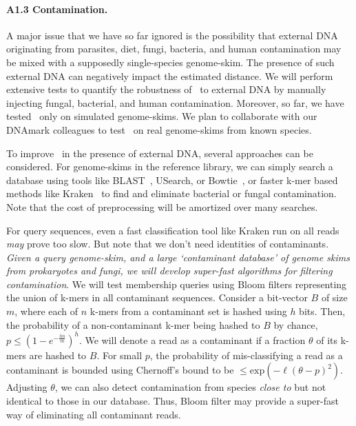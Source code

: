 \paragraph{A1.3 Contamination.}
A major issue that we have so far ignored is 
the possibility that external DNA originating from parasites, diet, fungi, bacteria, and human contamination may be mixed 
with a supposedly single-species genome-skim.
The presence of such external DNA can negatively impact the estimated distance. 
We will perform extensive tests
to quantify the robustness of \skmer\ to 
external DNA by manually injecting
fungal, bacterial, and human contamination.
Moreover, so far, we have tested \skmer\  only on simulated genome-skims. 
We plan to collaborate with our DNAmark colleagues
to test \skmer\ on real genome-skims from known species. 

To improve \skmer\ in the presence of external DNA,
several approaches can be considered.
For genome-skims in the reference library,
we can simply search a database using tools like BLAST~\cite{blast}, USearch\cite{usearch}, or Bowtie~\cite{Langmead2012a}, or faster k-mer based methods like Kraken~\cite{Kraken}  to find and eliminate bacterial or fungal contamination.
Note that the cost of preprocessing will be amortized over many searches.

For query sequences, even a fast classification tool like Kraken run
on all reads \textit{may} prove too slow.  But note that we don't need
identities of contaminants.  \emph{Given a query genome-skim, and a
  large `contaminant database' of genome skims from prokaryotes and
  fungi, we will develop super-fast algorithms for filtering
  contamination}.  We will test membership queries using Bloom filters
representing the union of k-mers in all contaminant
sequences. Consider a bit-vector $B$ of size $m$, where each of $n$
k-mers from a contaminant set is hashed using $h$ bits. Then, the
probability of a non-contaminant k-mer being hashed to $B$ by chance,
$p \le (1-e^{-\frac{hn}{m}})^h$. We will denote a read as a
contaminant if a fraction $\theta$ of its k-mers are hashed to
$B$. For small $p$, the probability of mis-classifying a read as a
contaminant is bounded using Chernoff's bound to be
$\le\text{exp}(-\ell(\theta-p)^2)$.  Adjusting $\theta$, we can also
detect contamination from species {\em close to} but not identical to
those in our database.  Thus, Bloom filter may provide a super-fast
way of eliminating all contaminant reads.

